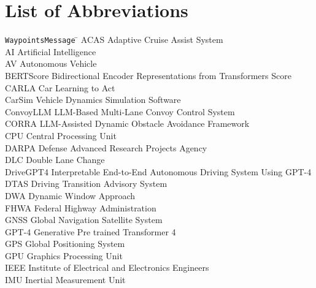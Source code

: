 \documentclass[a4paper,12pt,one side]{report}
\theoremstyle{definition}
\begin{document}
\newpage
{}
\chapter*{List of Abbreviations}
\vspace{1cm}
\begin{tabbing}
\texttt{WaypointsMessage}\hspace{0.8cm} \= \kill
ACAS             \> Adaptive Cruise Assist System \\[4pt]
AI               \> Artificial Intelligence \\[4pt]
AV               \> Autonomous Vehicle \\[4pt]
BERTScore        \> Bidirectional Encoder Representations from Transformers Score \\[4pt]
CARLA            \> Car Learning to Act \\[4pt]
CarSim           \> Vehicle Dynamics Simulation Software \\[4pt]
ConvoyLLM        \> LLM-Based Multi-Lane Convoy Control System \\[4pt]
CORRA            \> LLM-Assisted Dynamic Obstacle Avoidance Framework \\[4pt]
CPU              \> Central Processing Unit \\[4pt]
DARPA            \> Defense Advanced Research Projects Agency \\[4pt]
DLC              \> Double Lane Change \\[4pt]
DriveGPT4        \> Interpretable End-to-End Autonomous Driving System Using GPT-4 \\[4pt]
DTAS             \> Driving Transition Advisory System \\[4pt]
DWA              \> Dynamic Window Approach \\[4pt]
FHWA             \> Federal Highway Administration \\[4pt]
GNSS             \> Global Navigation Satellite System \\[4pt]
GPT-4            \> Generative Pre trained Transformer 4 \\[4pt]
GPS              \> Global Positioning System \\[4pt]
GPU              \> Graphics Processing Unit \\[4pt]
IEEE             \> Institute of Electrical and Electronics Engineers \\[4pt]
IMU              \> Inertial Measurement Unit \\[4pt]

\end{tabbing}
\end{document}
